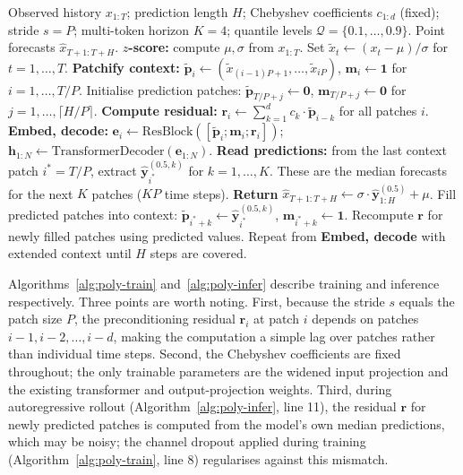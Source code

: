 \documentclass[11pt]{article}
\theoremstyle{plain}
\theoremstyle{definition}
\theoremstyle{remark}
\begin{document}
\begin{algorithm}[t]
\caption{Inference with Polynomial Input Preconditioning}
\label{alg:poly-infer}
\begin{algorithmic}[1]
\REQUIRE Observed history $x_{1:T}$; prediction length $H$; Chebyshev coefficients $c_{1:d}$ (fixed); stride $s = P$; multi-token horizon $K = 4$; quantile levels $\mathcal{Q} = \{0.1, \ldots, 0.9\}$.
\ENSURE Point forecasts $\hat{x}_{T+1:T+H}$.
\STATE \textbf{$z$-score:} compute $\mu, \sigma$ from $x_{1:T}$. Set $\tilde{x}_t \leftarrow (x_t - \mu)/\sigma$ for $t = 1, \ldots, T$.
\STATE \textbf{Patchify context:} $\tilde{\mathbf{p}}_i \leftarrow (\tilde{x}_{(i-1)P+1}, \ldots, \tilde{x}_{iP})$, $\mathbf{m}_i \leftarrow \mathbf{1}$ for $i = 1, \ldots, T/P$.
\STATE Initialise prediction patches: $\tilde{\mathbf{p}}_{T/P+j} \leftarrow \mathbf{0}$, $\mathbf{m}_{T/P+j} \leftarrow \mathbf{0}$ for $j = 1, \ldots, \lceil H/P \rceil$.
\STATE \textbf{Compute residual:} $\mathbf{r}_i \leftarrow \sum_{k=1}^{d} c_k \cdot \tilde{\mathbf{p}}_{i-k}$ for all patches $i$. 
\STATE \textbf{Embed, decode:} $\mathbf{e}_i \leftarrow \mathrm{ResBlock}([\tilde{\mathbf{p}}_i; \mathbf{m}_i; \mathbf{r}_i])$; $\mathbf{h}_{1:N} \leftarrow \mathrm{TransformerDecoder}(\mathbf{e}_{1:N})$.
\STATE \textbf{Read predictions:} from the last context patch $i^* = T/P$, extract $\hat{\mathbf{y}}_{i^*}^{(0.5, k)}$ for $k = 1, \ldots, K$. These are the median forecasts for the next $K$ patches ($KP$ time steps).
    \STATE \textbf{Return} $\hat{x}_{T+1:T+H} \leftarrow \sigma \cdot \hat{\mathbf{y}}^{(0.5)}_{1:H} + \mu$.
    \STATE Fill predicted patches into context: $\tilde{\mathbf{p}}_{i^*+k} \leftarrow \hat{\mathbf{y}}_{i^*}^{(0.5,k)}$, $\mathbf{m}_{i^*+k} \leftarrow \mathbf{1}$.
    \STATE Recompute $\mathbf{r}$ for newly filled patches using predicted values.
    \STATE Repeat from \textbf{Embed, decode} with extended context until $H$ steps are covered.
\ENDIF
\end{algorithmic}
\end{algorithm}

Algorithms~\ref{alg:poly-train} and~\ref{alg:poly-infer} describe training and inference respectively. Three points are worth noting. First, because the stride $s$ equals the patch size $P$, the preconditioning residual $\mathbf{r}_i$ at patch $i$ depends on patches $i{-}1, i{-}2, \ldots, i{-}d$, making the computation a simple lag over patches rather than individual time steps. Second, the Chebyshev coefficients are fixed throughout; the only trainable parameters are the widened input projection and the existing transformer and output-projection weights. Third, during autoregressive rollout (Algorithm~\ref{alg:poly-infer}, line 11), the residual $\mathbf{r}$ for newly predicted patches is computed from the model's own median predictions, which may be noisy; the channel dropout applied during training (Algorithm~\ref{alg:poly-train}, line 8) regularises against this mismatch.
\end{document}
